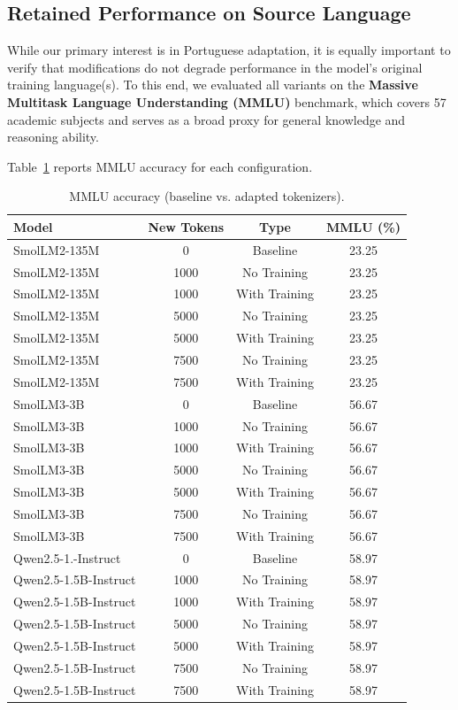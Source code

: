 \subsection{Retained Performance on Source Language}

While our primary interest is in Portuguese adaptation, it is equally important to verify that modifications do not degrade performance in the model’s original training language(s). To this end, we evaluated all variants on the \textbf{Massive Multitask Language Understanding (MMLU)} benchmark, which covers 57 academic subjects and serves as a broad proxy for general knowledge and reasoning ability.

Table~\ref{tab:mmlu-results} reports MMLU accuracy for each configuration.

\begin{table}[h]
\centering
\begin{tabular}{lccc}
\hline
\textbf{Model} & \textbf{New Tokens} & \textbf{Type} & \textbf{MMLU (\%)} \\
\hline
SmolLM2-135M   & 0     & Baseline      & 23.25 \\
SmolLM2-135M   & 1000  & No Training   & 23.25 \\
SmolLM2-135M   & 1000  & With Training & 23.25 \\
SmolLM2-135M   & 5000  & No Training   & 23.25 \\
SmolLM2-135M   & 5000  & With Training & 23.25 \\
SmolLM2-135M   & 7500  & No Training   & 23.25 \\
SmolLM2-135M   & 7500  & With Training & 23.25 \\
\hline
SmolLM3-3B     & 0     & Baseline      & 56.67 \\
SmolLM3-3B     & 1000  & No Training   & 56.67 \\
SmolLM3-3B     & 1000  & With Training & 56.67 \\
SmolLM3-3B     & 5000  & No Training   & 56.67 \\
SmolLM3-3B     & 5000  & With Training & 56.67 \\
SmolLM3-3B     & 7500  & No Training   & 56.67 \\
SmolLM3-3B     & 7500  & With Training & 56.67 \\
\hline
Qwen2.5-1.-Instruct   & 0     & Baseline      & 58.97 \\
Qwen2.5-1.5B-Instruct   & 1000  & No Training   & 58.97 \\
Qwen2.5-1.5B-Instruct   & 1000  & With Training & 58.97 \\
Qwen2.5-1.5B-Instruct   & 5000  & No Training   & 58.97 \\
Qwen2.5-1.5B-Instruct   & 5000  & With Training & 58.97 \\
Qwen2.5-1.5B-Instruct   & 7500  & No Training   & 58.97 \\
Qwen2.5-1.5B-Instruct   & 7500  & With Training & 58.97 \\
\hline
\end{tabular}
\caption{MMLU accuracy (baseline vs. adapted tokenizers).}
\label{tab:mmlu-results}
\end{table}

